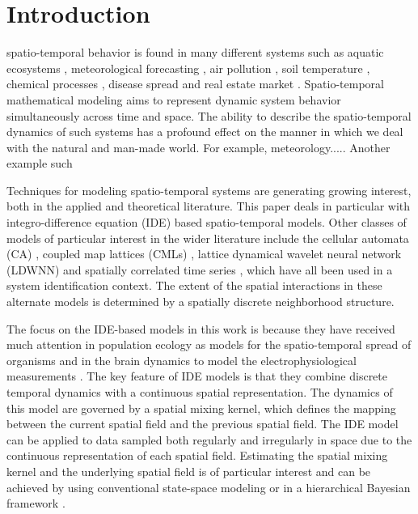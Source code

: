 \documentclass[10pt,twocolumn,twoside]{IEEEtran}
\begin{document}
%
\IEEEpeerreviewmaketitle



\section{Introduction}
 spatio-temporal behavior is found in many different systems such as aquatic ecosystems \cite{Schofield2002}, meteorological forecasting \cite{Xu2005}, air pollution \cite{Romanowicz2006}, soil temperature  \cite{Bond-Lamberty2005}, chemical processes \cite{Deng2005}, disease spread \cite{Kuo2009} and real estate market \cite{Sun2005}. Spatio-temporal mathematical modeling aims to represent dynamic system behavior simultaneously across time and space. The ability to describe the spatio-temporal dynamics of such systems has a profound effect on the manner in which we deal with the natural and man-made world. For example, meteorology..... Another example such
 
Techniques for modeling spatio-temporal systems are generating growing interest, both in the applied and theoretical literature. This paper deals in particular with integro-difference equation (IDE) based spatio-temporal models. Other classes of models of particular interest in the wider literature include the cellular automata (CA) \cite{Wolfram1994}, coupled map lattices (CMLs) \cite{Billings2002}, lattice dynamical wavelet neural network (LDWNN) \cite{Wei2009} and spatially correlated time series \cite{Pfeifer1980,Glasbey2008,Dewar2007}, which have all been used in a system identification context. The extent of the spatial interactions in these alternate models is determined by a spatially discrete neighborhood structure.

The focus on the IDE-based models in this work is because they have received much attention in population ecology as models for the spatio-temporal spread of organisms \cite{Kot1992,Kot1996} and in the brain dynamics to model the electrophysiological measurements \cite{Deco2008,Schiff2008,Freestone2011}. The key feature of IDE models is that they combine discrete temporal dynamics with a continuous spatial representation. The dynamics of this model are governed by a spatial mixing kernel, which defines the mapping between the current spatial field and the previous spatial field. The IDE model can be applied to data sampled both regularly and irregularly in space due to the continuous representation of each spatial field. Estimating the spatial mixing kernel and the underlying spatial field is of particular interest and can be achieved by  using conventional state-space modeling \cite{Dewar2009,Scerri2009} or in a hierarchical Bayesian framework \cite{Wikle1999,Xu2005,Wikle2011}. 
\end{document}
